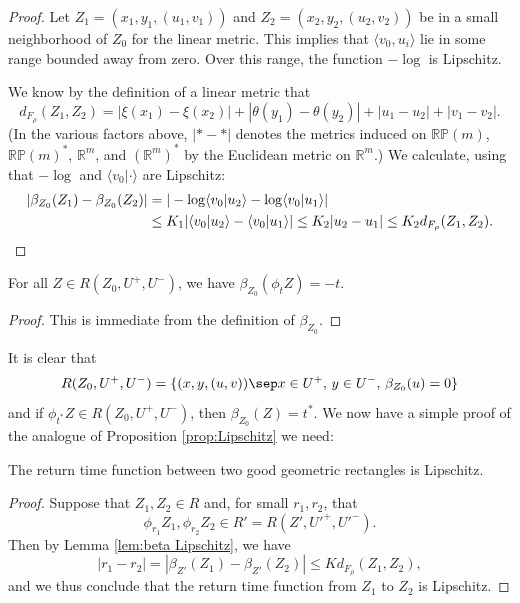 \begin{proof}
Let $Z_1=(x_1,y_1,(u_1,v_1))$ and $Z_2=(x_2,y_2,(u_2,v_2))$ be in a small neighborhood of $Z_0$ for the linear metric. This implies that $\langle v_0,u_i\rangle$ lie in some range bounded away from zero. Over this range, the function $-\log$ is Lipschitz.

We know by the definition of a linear metric that\vspace*{-3pt}\enlargethispage{\baselineskip}%
\[ d_{F_\rho}(Z_1,Z_2) = |\xi(x_1)-\xi(x_2)| + |\theta(y_1)-\theta(y_2)| + |u_1-u_2| + |v_1-v_2|. \]
(In the various factors above, $|* - *|$ denotes the metrics induced on $\mathbb{RP}(m)$, $\mathbb{RP}(m)^*$, $\mathbb{R}^m$, and $(\mathbb{R}^m)^*$ by the Euclidean metric on $\mathbb{R}^m$.)
We calculate, using that $-\log$ and $\langle v_0 | \cdot\rangle$ are Lipschitz:\vspace*{-3pt}
\begin{align*}
|\beta_{Z_0}(Z_1)-\beta_{Z_0}(Z_2)| &= |-\log\langle v_0|u_2\rangle - \log\langle v_0|u_1\rangle |\\
& \leq K_1 |\langle v_0|u_2 \rangle - \langle v_0|u_1 \rangle| 
 \leq K_2 |u_2-u_1| \leq K_2 d_{F_\rho}(Z_1,Z_2). \qedhere
\end{align*}
\end{proof}

\begin{lem}
For all $Z\in R(Z_0,U^+,U^-)$, we have $\beta_{Z_0}(\phi_t Z) = -t$.
\end{lem}

\begin{proof}
This is immediate from the definition of $\beta_{Z_0}$.
\end{proof}

It is clear that\vspace*{-3pt}
\[
R(Z_0, U^+, U^-) = \{ (x,y,(u,v)) \sep x\in U^+,\, y\in U^-,\, \beta_{Z_0}(u)=0\}
\]
and if $\phi_{t^*}Z \in R(Z_0,U^+,U^-)$, then $\beta_{Z_0}(Z)=t^*$. We now have a simple proof of the analogue of Proposition \ref{prop:Lipschitz} we need:

\begin{prop}
The return time function between two good geometric rectangles is Lipschitz.
\end{prop}

\begin{proof}
Suppose that $Z_1, Z_2 \in R$ and, for small $r_1, r_2$, that\vspace*{-3pt}
\[
\phi_{r_1}Z_1, \phi_{r_2}Z_2 \in R'=R(Z',U'^+, U'^-).
\]
Then by Lemma \ref{lem:beta Lipschitz}, we have\vspace*{-4pt}
\[
|r_1-r_2| = |\beta_{Z'}(Z_1) - \beta_{Z'}(Z_2)| \leq K d_{F_\rho}(Z_1, Z_2),
\]
and we thus conclude that the return time function from $Z_1$ to $Z_2$ is Lipschitz.
\end{proof}

